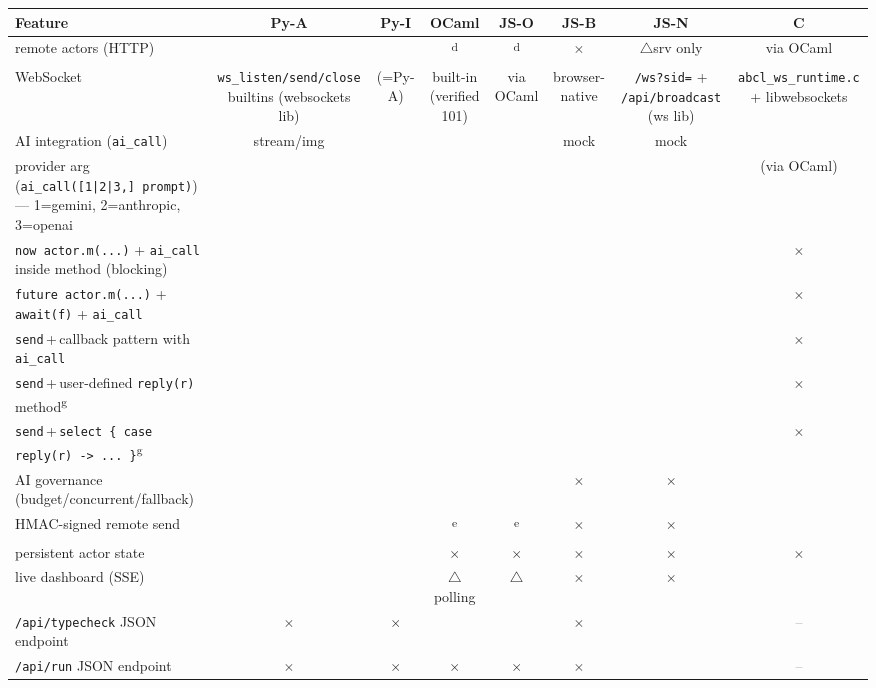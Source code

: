 \documentclass[10pt,a4paper,landscape]{article}
\newcommand{\Yes}{\textcolor{green!50!black}{\textbf{\checkmark}}}
\newcommand{\No}{\textcolor{red!70!black}{$\times$}}
\newcommand{\Part}{\textcolor{orange!80!black}{$\triangle$}}
\newcommand{\NA}{\textcolor{gray}{--}}
\begin{document}
\begin{longtable}{F C C C C C C C}
  \toprule
  \textbf{Feature} & \textbf{Py-A} & \textbf{Py-I} & \textbf{OCaml} & \textbf{JS-O} & \textbf{JS-B} & \textbf{JS-N} & \textbf{C} \\
  \midrule
  \endhead

  remote actors (HTTP)                          & \Yes & \Yes & \Yes\textsuperscript{d} & \Yes\textsuperscript{d} & \No & \Part srv only & \Yes via OCaml \\
  WebSocket                                     & \Yes \texttt{ws\_listen/send/close} builtins (websockets lib) & \Yes (=Py-A) & \Yes built-in (verified 101) & \Yes via OCaml & \Yes browser-native & \Yes \texttt{/ws?sid=} + \texttt{/api/broadcast} (ws lib) & \Yes \texttt{abcl\_ws\_runtime.c} + libwebsockets \\
  AI integration (\texttt{ai\_call})            & \Yes stream/img & \Yes & \Yes & \Yes & \Yes mock & \Yes mock & \Yes \\
  \quad provider arg (\texttt{ai\_call([1|2|3,] prompt)}) — 1=gemini, 2=anthropic, 3=openai & \Yes & \Yes & \Yes & \Yes & \Yes & \Yes & \Yes (via OCaml) \\
  \quad \texttt{now actor.m(...)} + \texttt{ai\_call} inside method (blocking) & \Yes & \Yes & \Yes & \Yes & \Yes & \Yes & \No \\
  \quad \texttt{future actor.m(...)} + \texttt{await(f)} + \texttt{ai\_call} & \Yes & \Yes & \Yes & \Yes & \Yes & \Yes & \No \\
  \quad \texttt{send}\,+\,callback pattern with \texttt{ai\_call} & \Yes & \Yes & \Yes & \Yes & \Yes & \Yes & \No \\
  \quad \texttt{send}\,+\,user-defined \texttt{reply(r)} method\textsuperscript{g} & \Yes & \Yes & \Yes & \Yes & \Yes & \Yes & \No \\
  \quad \texttt{send}\,+\,\texttt{select \{ case reply(r) -> ... \}}\textsuperscript{g} & \Yes & \Yes & \Yes & \Yes & \Yes & \Yes & \No \\
  AI governance (budget/concurrent/fallback)    & \Yes & \Yes & \Yes & \Yes & \No & \No & \Yes \\
  HMAC-signed remote send                       & \Yes & \Yes & \Yes\textsuperscript{e} & \Yes\textsuperscript{e} & \No & \No & \Yes \\
  persistent actor state                        & \Yes & \Yes & \No & \No & \No & \No & \No \\
  live dashboard (SSE)                          & \Yes & \Yes & \Part polling & \Part & \No & \No & \Yes \\
  \texttt{/api/typecheck} JSON endpoint         & \No & \No & \Yes & \Yes & \No & \Yes & \NA \\
  \texttt{/api/run} JSON endpoint               & \No & \No & \No & \No & \No & \Yes & \NA \\
  \bottomrule
\end{longtable}
\end{document}
